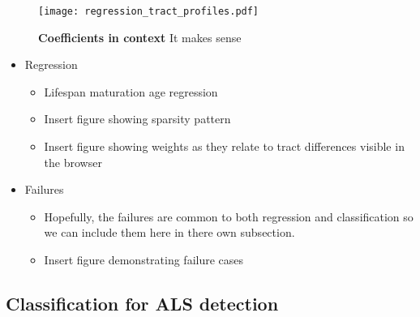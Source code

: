 \begin{figure}[!h]
    \centering
    \texttt{[image: regression\_tract\_profiles.pdf]}
    \caption{{\bf Coefficients in context}
    It makes sense
    }
    \label{fig:regress-profiles}
\end{figure}


\begin{itemize}
  \item Regression
    \begin{itemize}
      \item Lifespan maturation age regression
      \item Insert figure showing sparsity pattern
      \item Insert figure showing weights as they relate to tract differences visible in the browser
    \end{itemize}
\end{itemize}
\begin{itemize}
  \item Failures
    \begin{itemize}
      \item Hopefully, the failures are common to both regression
        and classification so we can include them here in there own
        subsection.
      \item Insert figure demonstrating failure cases
    \end{itemize}
\end{itemize}

\subsection*{Classification for ALS detection}

